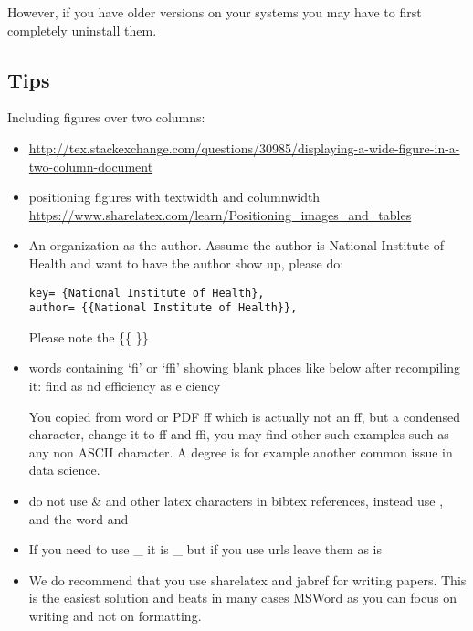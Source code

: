 However, if you have older versions on your systems you may have to
first completely uninstall them.

\subsection{Tips}\label{tips}

Including figures over two columns:

\begin{itemize}
\item
  \url{http://tex.stackexchange.com/questions/30985/displaying-a-wide-figure-in-a-two-column-document}
\item
  positioning figures with textwidth and columnwidth
  \url{https://www.sharelatex.com/learn/Positioning_images_and_tables}
\item
  An organization as the author. Assume the author is National Institute
  of Health and want to have the author show up, please do:

\begin{verbatim}
key= {National Institute of Health},
author= {{National Institute of Health}},
\end{verbatim}

  Please note the \{\{ \}\}
\item
  words containing `fi' or `ffi' showing blank places like below after
  recompiling it: find as nd efficiency as e ciency

  You copied from word or PDF ff which is actually not an ff, but a
  condensed character, change it to ff and ffi, you may find other such
  examples such as any non ASCII character. A degree is for example
  another common issue in data science.
\item
  do not use \textbar{} \& and other latex characters in bibtex
  references, instead use , and the word and
\item
  If you need to use \_ it is \_ but if you use urls leave them as is
\item
  We do recommend that you use sharelatex and jabref for writing papers.
  This is the easiest solution and beats in many cases MSWord as you can
  focus on writing and not on formatting.
\end{itemize}
